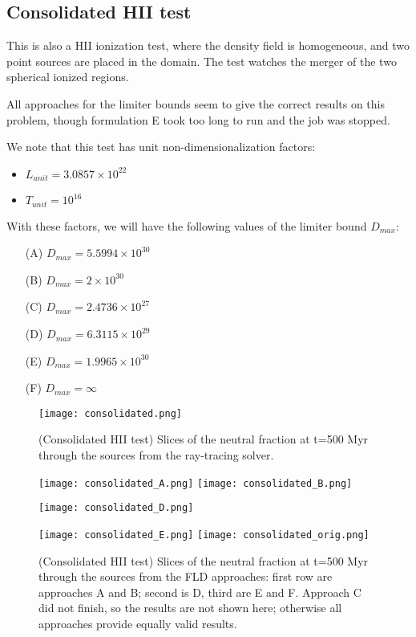 \documentclass[letterpaper,11pt]{article}
\begin{document}
\subsection{Consolidated HII test}
\label{sec:ConsolidatedTest}

This is also a HII ionization test, where the density field is
homogeneous, and two point sources are placed in the domain. The test
watches the merger of the two spherical ionized regions.  

All approaches for the limiter bounds seem to give the correct results
on this problem, though formulation E took too long to run and the job
was stopped. 

We note that this test has unit non-dimensionalization factors:
\begin{itemize}
\item $L_{unit} = 3.0857\times10^{22}$
\item $T_{unit} = 10^{16}$
\end{itemize}
With these factors, we will have the following values of the limiter
bound $D_{max}$:
\begin{itemize}
\item[(A)] $D_{max} = 5.5994\times10^{30}$
\item[(B)] $D_{max} = 2\times10^{30}$
\item[(C)] $D_{max} = 2.4736\times10^{27}$
\item[(D)] $D_{max} = 6.3115\times10^{29}$
\item[(E)] $D_{max} = 1.9965\times10^{30}$
\item[(F)] $D_{max} = \infty$
\end{itemize}


\begin{figure}[t]
  \centerline{
  \texttt{[image: consolidated.png]}
  }
  \caption{(Consolidated HII test) Slices of the neutral fraction at
    t=500 Myr through the sources from the ray-tracing solver.} 
  \label{fig:consolidated_RT}
\end{figure}

\begin{figure}[t]
  \centerline{
  \texttt{[image: consolidated\_A.png]}
  \texttt{[image: consolidated\_B.png]}
  }
  \centerline{
  \hfill
  \texttt{[image: consolidated\_D.png]}
  }
  \centerline{
  \texttt{[image: consolidated\_E.png]}
  \texttt{[image: consolidated\_orig.png]}
  }
  \caption{(Consolidated HII test) Slices of the neutral fraction at
    t=500 Myr through the sources from the FLD approaches: first row
    are approaches A and B; second is D, third are E and F.
    Approach C did not finish, so the results are not shown here;
    otherwise all approaches provide equally valid results.} 
  \label{fig:consolidated}
\end{figure}
\end{document}
